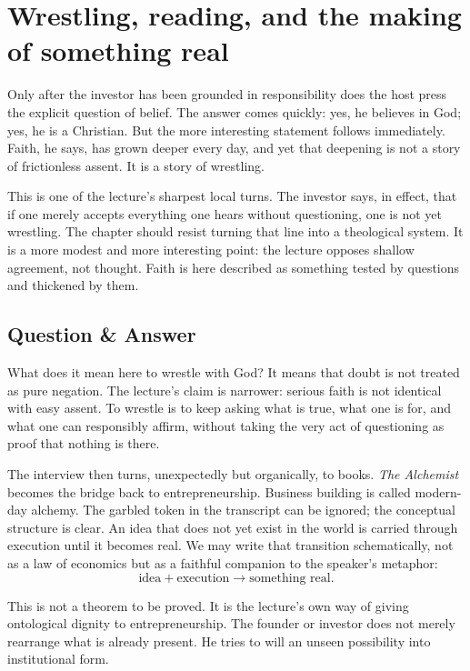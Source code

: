 \section{Wrestling, reading, and the making of something real}

Only after the investor has been grounded in responsibility does the host press the explicit question of belief. The answer comes quickly: yes, he believes in God; yes, he is a Christian. But the more interesting statement follows immediately. Faith, he says, has grown deeper every day, and yet that deepening is not a story of frictionless assent. It is a story of wrestling.

This is one of the lecture's sharpest local turns. The investor says, in effect, that if one merely accepts everything one hears without questioning, one is not yet wrestling. The chapter should resist turning that line into a theological system. It is a more modest and more interesting point: the lecture opposes shallow agreement, not thought. Faith is here described as something tested by questions and thickened by them.

\subsection{Question \& Answer}

What does it mean here to wrestle with God? It means that doubt is not treated as pure negation. The lecture's claim is narrower: serious faith is not identical with easy assent. To wrestle is to keep asking what is true, what one is for, and what one can responsibly affirm, without taking the very act of questioning as proof that nothing is there.

The interview then turns, unexpectedly but organically, to books. \emph{The Alchemist} becomes the bridge back to entrepreneurship. Business building is called modern-day alchemy. The garbled token in the transcript can be ignored; the conceptual structure is clear. An idea that does not yet exist in the world is carried through execution until it becomes real. We may write that transition schematically, not as a law of economics but as a faithful companion to the speaker's metaphor:
\begin{equation}
\text{idea} + \text{execution} \longrightarrow \text{something real}.
\end{equation}

This is not a theorem to be proved. It is the lecture's own way of giving ontological dignity to entrepreneurship. The founder or investor does not merely rearrange what is already present. He tries to will an unseen possibility into institutional form.

